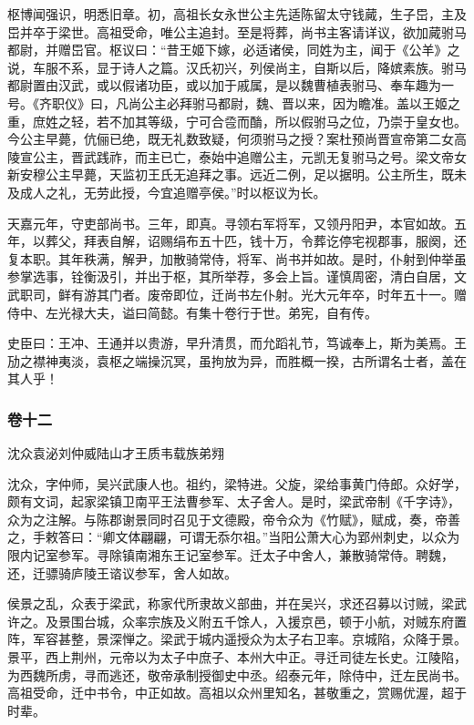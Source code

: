 \documentclass[]{article}
\begin{document}
枢博闻强识，明悉旧章。初，高祖长女永世公主先适陈留太守钱蕆，生子岊，主及岊并卒于梁世。高祖受命，唯公主追封。至是将葬，尚书主客请详议，欲加蕆驸马都尉，并赠岊官。枢议曰：``昔王姬下嫁，必适诸侯，同姓为主，闻于《公羊》之说，车服不系，显于诗人之篇。汉氏初兴，列侯尚主，自斯以后，降嫔素族。驸马都尉置由汉武，或以假诸功臣，或以加于戚属，是以魏曹植表驸马、奉车趣为一号。《齐职仪》曰，凡尚公主必拜驸马都尉，魏、晋以来，因为瞻准。盖以王姬之重，庶姓之轻，若不加其等级，宁可合卺而酳，所以假驸马之位，乃崇于皇女也。今公主早薨，伉俪已绝，既无礼数致疑，何须驸马之授？案杜预尚晋宣帝第二女高陵宣公主，晋武践祚，而主已亡，泰始中追赠公主，元凯无复驸马之号。梁文帝女新安穆公主早薨，天监初王氏无追拜之事。远近二例，足以据明。公主所生，既未及成人之礼，无劳此授，今宜追赠亭侯。''时以枢议为长。

天嘉元年，守吏部尚书。三年，即真。寻领右军将军，又领丹阳尹，本官如故。五年，以葬父，拜表自解，诏赐绢布五十匹，钱十万，令葬讫停宅视郡事，服阕，还复本职。其年秩满，解尹，加散骑常侍，将军、尚书并如故。是时，仆射到仲举虽参掌选事，铨衡汲引，并出于枢，其所举荐，多会上旨。谨慎周密，清白自居，文武职司，鲜有游其门者。废帝即位，迁尚书左仆射。光大元年卒，时年五十一。赠侍中、左光禄大夫，谥曰简懿。有集十卷行于世。弟宪，自有传。

史臣曰：王冲、王通并以贵游，早升清贯，而允蹈礼节，笃诚奉上，斯为美焉。王劢之襟神夷淡，袁枢之端操沉冥，虽拘放为异，而胜概一揆，古所谓名士者，盖在其人乎！

\hypertarget{header-n4558}{%
\subsubsection{卷十二}\label{header-n4558}}

沈众袁泌刘仲威陆山才王质韦载族弟翙

沈众，字仲师，吴兴武康人也。祖约，梁特进。父旋，梁给事黄门侍郎。众好学，颇有文词，起家梁镇卫南平王法曹参军、太子舍人。是时，梁武帝制《千字诗》，众为之注解。与陈郡谢景同时召见于文德殿，帝令众为《竹赋》，赋成，奏，帝善之，手敕答曰：``卿文体翩翩，可谓无忝尔祖。''当阳公萧大心为郢州刺史，以众为限内记室参军。寻除镇南湘东王记室参军。迁太子中舍人，兼散骑常侍。聘魏，还，迁骠骑庐陵王谘议参军，舍人如故。

侯景之乱，众表于梁武，称家代所隶故义部曲，并在吴兴，求还召募以讨贼，梁武许之。及景围台城，众率宗族及义附五千馀人，入援京邑，顿于小航，对贼东府置阵，军容甚整，景深惮之。梁武于城内遥授众为太子右卫率。京城陷，众降于景。景平，西上荆州，元帝以为太子中庶子、本州大中正。寻迁司徒左长史。江陵陷，为西魏所虏，寻而逃还，敬帝承制授御史中丞。绍泰元年，除侍中，迁左民尚书。高祖受命，迁中书令，中正如故。高祖以众州里知名，甚敬重之，赏赐优渥，超于时辈。
\end{document}
